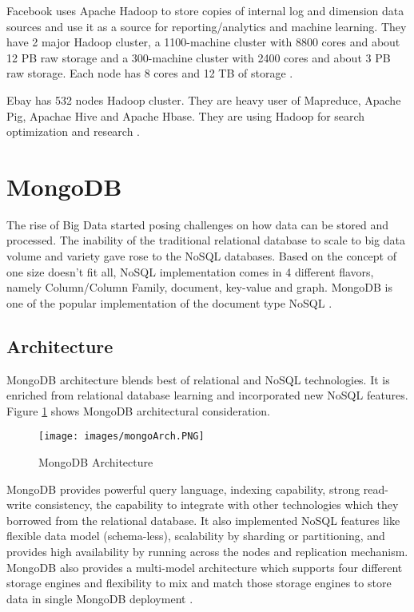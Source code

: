\documentclass[sigconf]{acmart}
\begin{document}
Facebook uses Apache Hadoop to store copies of internal log and dimension data sources and use it as a source for reporting/analytics and machine learning. They have 2 major Hadoop cluster, a 1100-machine cluster with 8800 cores and about 12 PB raw storage and a 300-machine cluster with 2400 cores and about 3 PB raw storage. Each node has 8 cores and 12 TB of storage \cite{www-apache-poweredby}.

Ebay has 532 nodes Hadoop cluster. They are heavy user of Mapreduce, Apache Pig, Apachae Hive and Apache Hbase. They are using Hadoop for search optimization and research \cite{www-apache-poweredby}. 

\section{MongoDB}
The rise of Big Data started posing challenges on how data can be stored and processed. The inability of the traditional relational database to scale to big data volume and variety gave rose to the NoSQL databases. Based on the concept of one size doesn't fit all, NoSQL implementation comes in 4 different flavors, namely Column/Column Family, document, key-value and graph. MongoDB is one of the popular implementation of the document type NoSQL \cite{Harrison2015}.

\subsection{Architecture}
MongoDB architecture blends best of relational and NoSQL technologies. It is enriched from relational database learning and incorporated new NoSQL features.
Figure \ref{f:mongo-arch} shows MongoDB architectural consideration.
\begin{figure}[!ht]
  \centering\texttt{[image: images/mongoArch.PNG]}
  \caption{MongoDB Architecture \cite{www-mongo-arch}}\label{f:mongo-arch}
\end{figure}
MongoDB provides powerful query language, indexing capability, strong read-write consistency, the capability to integrate with other technologies which they borrowed from the relational database. It also implemented NoSQL features like flexible data model (schema-less),  scalability by sharding or partitioning, and provides high availability by running across the nodes and replication mechanism. MongoDB also provides a multi-model architecture which supports four different storage engines and flexibility to mix and match those storage engines to store data in single MongoDB deployment \cite{www-mongo-arch}.
\end{document}
